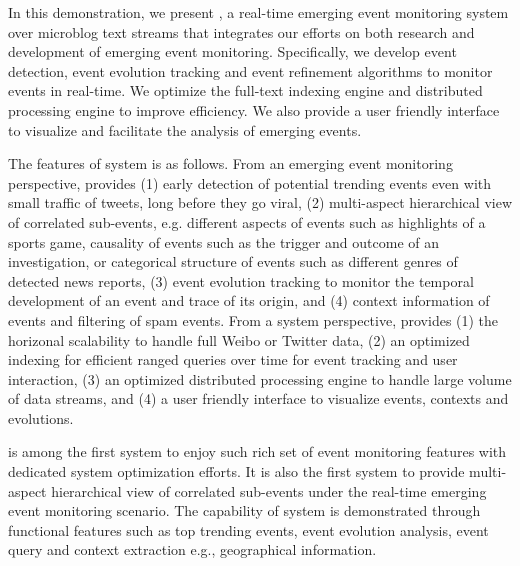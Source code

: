 In this demonstration, we present \ring, a real-time emerging event monitoring system over microblog text streams that integrates our efforts on both research and development of emerging event monitoring.
Specifically, we develop event detection, event evolution tracking and event refinement algorithms to monitor events in real-time.
We optimize the full-text indexing engine and distributed processing engine to improve efficiency.
We also provide a user friendly interface to visualize and facilitate the analysis of emerging events.

The features of \ring system is as follows.
%
From an emerging event monitoring perspective, \ring provides
(1) early detection of potential trending events even with small traffic of tweets, long before they go viral, 
(2) multi-aspect hierarchical view of correlated sub-events, e.g. different aspects of events such as highlights of a sports game, causality of events such as the trigger and outcome of an investigation, or categorical structure of events such as different genres of detected news reports,
(3) event evolution tracking to monitor the temporal development of an event and trace of its origin, and
(4) context information of events and filtering of spam events.
From a system perspective, \ring provides
(1) the horizonal scalability to handle full Weibo or Twitter data,
(2) an optimized indexing for efficient ranged queries over time for event tracking and user interaction,
(3) an optimized distributed processing engine to handle large volume of data streams, and
(4) a user friendly  interface to visualize events, contexts and evolutions.

\ring is among the first system to enjoy such rich set of event monitoring features with dedicated system optimization efforts.
It is also the first system to provide multi-aspect hierarchical view of correlated sub-events under the real-time emerging event monitoring scenario.
The capability of \ring system is demonstrated through functional features such as top trending events, event evolution analysis, event query and context extraction e.g., geographical information.

